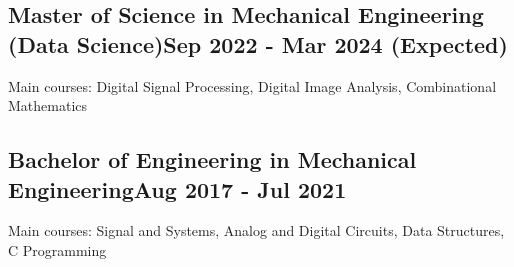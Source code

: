 \vspace*{10pt}
\subsection {{Master of Science in Mechanical Engineering (Data Science)}\hfill Sep 2022 - Mar 2024 (Expected)}
\vspace*{5pt}
Main courses: Digital Signal Processing, Digital Image Analysis, Combinational Mathematics

\vspace*{6pt}
\subsection{{Bachelor of Engineering  in Mechanical Engineering}\hfill Aug 2017 - Jul 2021}
\vspace*{5pt}
Main courses: Signal and Systems, Analog and Digital Circuits, Data Structures, C Programming
